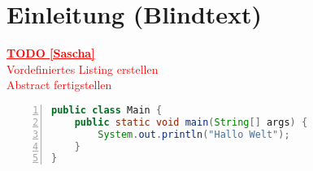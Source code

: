 \documentclass[ngerman]{ewks-latex}
\newcommand{\todo}[2]{\textcolor{red}{\underline{\textbf{TODO [#1]}} \\ #2}}
\begin{document}
\section{Einleitung (Blindtext)}
\cite{latex}

\todo{Sascha}{Vordefiniertes Listing erstellen \\Abstract fertigstellen}
\begin{lstlisting}[float, caption=Beispiel eines Java-Listings, label=lst:example, language=java, basicstyle=\small, tabsize=4, showstringspaces=false, numbers=left, frame=single, keywordstyle=\bfseries]
public class Main {
	public static void main(String[] args) {
		System.out.println("Hallo Welt");
	}
}
\end{lstlisting}


\newpage




\end{document}
